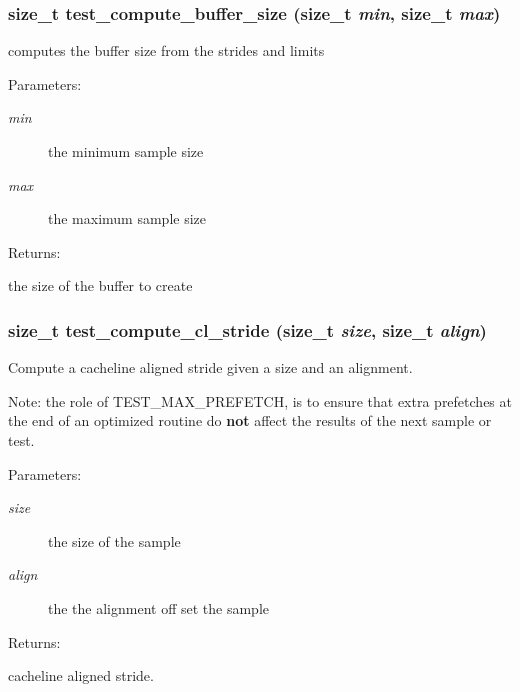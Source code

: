\subsubsection{\setlength{\rightskip}{0pt plus 5cm}size\_\-t test\_\-compute\_\-buffer\_\-size (size\_\-t {\em min}, size\_\-t {\em max})}\label{group__test__comp_a1}


computes the buffer size from the strides and limits

\begin{Desc}
\item[Parameters: ]\par
\begin{description}
\item[{\em 
min}]the minimum sample size \item[{\em 
max}]the maximum sample size \end{description}
\end{Desc}
\begin{Desc}
\item[Returns: ]\par
the size of the buffer to create \end{Desc}
\subsubsection{\setlength{\rightskip}{0pt plus 5cm}size\_\-t test\_\-compute\_\-cl\_\-stride (size\_\-t {\em size}, size\_\-t {\em align})}\label{group__test__comp_a0}


Compute a cacheline aligned stride given a size and an alignment.

Note: the role of TEST\_\-MAX\_\-PREFETCH, is to ensure that extra prefetches at the end of an optimized routine do {\bf not} affect the results of the next sample or test.\begin{Desc}
\item[Parameters: ]\par
\begin{description}
\item[{\em 
size}]the size of the sample \item[{\em 
align}]the the alignment off set the sample \end{description}
\end{Desc}
\begin{Desc}
\item[Returns: ]\par
cacheline aligned stride. \end{Desc}
